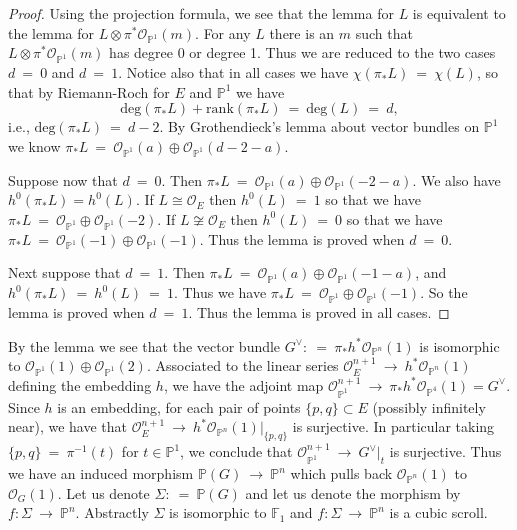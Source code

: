 \documentclass[twoside,12pt,reqno]{amsart}
\theoremstyle{plain}
\theoremstyle{definition}
\newcommand{\PP}{\mathbb{P}}
\def\ps{\vspace{4pt}}
\newcommand{\OO}{\mathcal O}
\begin{document}
\begin{proof}
Using the projection formula, we see that the lemma for $L$ is
equivalent to the lemma for $L\otimes \pi^*\OO_{\PP^1}(m)$.  For
any $L$ there is an $m$ such that $L\otimes \pi^*\OO_{\PP^1}(m)$ has
degree 0 or degree 1.  Thus we are reduced to the two cases $d~=~0$ and
$d~=~1$.  Notice also that in all cases we have $\chi(\pi_* L) ~=~
\chi(L)$, so that by Riemann-Roch for $E$ and $\PP^1$ we have 
\begin{equation} 
\text{deg}(\pi_* L) + \text{rank}(\pi_* L) ~=~ \text{deg}(L) ~=~ d,
\end{equation}
i.e., $\text{deg}(\pi_* L) ~=~ d-2$.  By Grothendieck's lemma about
vector bundles on $\PP^1$ we know $\pi_* L ~=~ \OO_{\PP^1}(a)\oplus
\OO_{\PP^1}(d-2-a)$.  

\ps

Suppose now that $d~=~0$.  Then $\pi_*L ~=~ \OO_{\PP^1}(a)\oplus
\OO_{\PP^1}(-2-a).$  We also have $h^0(\pi_* L) = h^0(L)$.  If $L
\cong \OO_E$ then $h^0(L) ~=~ 1$ so that we have $\pi_* L ~=~
\OO_{\PP^1}\oplus \OO_{\PP^1}(-2)$.  If $L\not\cong \OO_E$ then
$h^0(L)~=~0$ so that we have $\pi_* L ~=~ \OO_{\PP^1}(-1)\oplus
\OO_{\PP^1}(-1).$  Thus the lemma is proved when $d~=~0$.

\ps

Next suppose that $d~=~1$.  Then $\pi_* L ~=~ \OO_{\PP^1}(a)\oplus
\OO_{\PP^1}(-1-a)$,  and $h^0(\pi_* L) ~=~ h^0(L) ~=~ 1$.  Thus we have
$\pi_* L ~=~ \OO_{\PP^1} \oplus \OO_{\PP^1}(-1).$  So the lemma is
proved when $d~=~1$.  Thus the lemma is proved in all cases.
\end{proof}

By the lemma we see that the vector bundle $G^{\vee}:~=~\pi_* h^*
\OO_{\PP^n}(1)$ is isomorphic to $\OO_{\PP^1}(1) \oplus 
\OO_{\PP^1}(2)$.  Associated to the linear series
$\OO_E^{n+1}~\rightarrow~ h^*\OO_{\PP^n}(1)$ defining the embedding $h$,
we have the adjoint map $\OO_{\PP^1}^{n+1}~\rightarrow~ 
\pi_{*}h^{*}\OO_{\PP^4}(1)= G^{\vee}$.  Since $h$ is an embedding, for each pair of points $\{p,q\}
\subset E$ (possibly infinitely near), we have that
$\OO_E^{n+1}~\rightarrow~ h^*\OO_{\PP^n}(1)|_{\{p,q\}}$ is surjective.
In particular taking $\{p,q\}~=~\pi^{-1}(t)$ for $t\in \PP^1$, we
conclude that $\OO_{\PP^1}^{n+1}~\rightarrow~ G^{\vee}|_t$ is surjective.  Thus
we have an induced morphism $\PP(G)~\rightarrow~ \PP^n$ which pulls
back $\OO_{\PP^n}(1)$ to $\OO_{G}(1)$.  Let us
denote $\Sigma :~=~ \PP(G)$ and let us denote the morphism by
$f:\Sigma~\rightarrow~ \PP^n$.  Abstractly $\Sigma$ is isomorphic to
$\mathbb{F}_1$ and $f:\Sigma~\rightarrow~ \PP^n$ is a cubic scroll.
\end{document}

